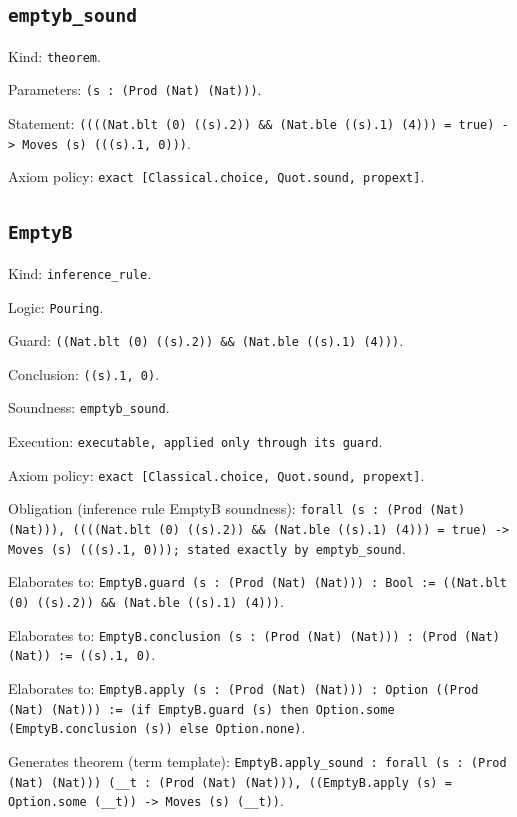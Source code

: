 \documentclass[11pt]{article}
\begin{document}
\subsection*{\texttt{emptyb\_sound}}
\noindent Kind: \texttt{theorem}.\par
\noindent Parameters: \texttt{(s : (Prod (Nat) (Nat)))}.\par
\noindent Statement: \texttt{((((Nat.blt (0) ((s).2)) \&\& (Nat.ble ((s).1) (4))) = true) -> Moves (s) (((s).1, 0)))}.\par
\noindent Axiom policy: \texttt{exact [Classical.choice, Quot.sound, propext]}.\par
\subsection*{\texttt{EmptyB}}
\noindent Kind: \texttt{inference_rule}.\par
\noindent Logic: \texttt{Pouring}.\par
\noindent Guard: \texttt{((Nat.blt (0) ((s).2)) \&\& (Nat.ble ((s).1) (4)))}.\par
\noindent Conclusion: \texttt{((s).1, 0)}.\par
\noindent Soundness: \texttt{emptyb\_sound}.\par
\noindent Execution: \texttt{executable, applied only through its guard}.\par
\noindent Axiom policy: \texttt{exact [Classical.choice, Quot.sound, propext]}.\par
\noindent Obligation (inference rule EmptyB soundness): \texttt{forall (s : (Prod (Nat) (Nat))), ((((Nat.blt (0) ((s).2)) \&\& (Nat.ble ((s).1) (4))) = true) -> Moves (s) (((s).1, 0))); stated exactly by emptyb\_sound}.\par
\noindent Elaborates to: \texttt{EmptyB.guard (s : (Prod (Nat) (Nat))) : Bool := ((Nat.blt (0) ((s).2)) \&\& (Nat.ble ((s).1) (4)))}.\par
\noindent Elaborates to: \texttt{EmptyB.conclusion (s : (Prod (Nat) (Nat))) : (Prod (Nat) (Nat)) := ((s).1, 0)}.\par
\noindent Elaborates to: \texttt{EmptyB.apply (s : (Prod (Nat) (Nat))) : Option ((Prod (Nat) (Nat))) := (if EmptyB.guard (s) then Option.some (EmptyB.conclusion (s)) else Option.none)}.\par
\noindent Generates theorem (term template): \texttt{EmptyB.apply\_sound : forall (s : (Prod (Nat) (Nat))) (\_\_t : (Prod (Nat) (Nat))), ((EmptyB.apply (s) = Option.some (\_\_t)) -> Moves (s) (\_\_t))}.\par
\end{document}
